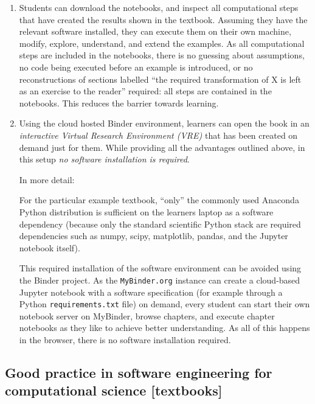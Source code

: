 \documentclass{deliverablereport}
\begin{document}
\begin{enumerate}
\item Students can download the notebooks, and inspect all
  computational steps that have created the results shown in the
  textbook. Assuming they have the relevant software installed,
  they can execute them on their own machine, modify,
  explore, understand, and extend the examples. As all computational
  steps are included in the notebooks, there is no guessing about
  assumptions, no code being executed before an example is introduced,
  or no reconstructions of sections labelled ``the required
  transformation of X is left as an exercise to the reader'' required:
  all steps are contained in the notebooks. This reduces the barrier
  towards learning.

\item Using the cloud hosted Binder environment, learners can open the
  book in an \emph{interactive Virtual Research Environment (VRE)}
  that has been created on demand just for them. While providing all
  the advantages outlined above, in this setup \emph{no software
    installation is required}.

  In more detail:

  For the particular example textbook, ``only'' the commonly used
  Anaconda Python distribution is sufficient on the learners laptop as
  a software dependency (because only the standard scientific Python stack
  are required dependencies such as numpy, scipy, matplotlib, pandas,
  and the Jupyter notebook itself).

  This required installation of the software environment can be
  avoided using the Binder project. As the
  \texttt{MyBinder.org} instance can create a cloud-based Jupyter
  notebook with a software specification (for example through a Python
  \texttt{requirements.txt} file) on demand, every student can start
  their own notebook server on MyBinder, browse chapters, and execute
  chapter notebooks as they like to achieve better understanding. As
  all of this happens in the browser, there is no software
  installation required.
\end{enumerate}

\subsection{Good practice in software engineering for
  computational science [textbooks]}\label{sec:good-pract-softw}
\end{document}
